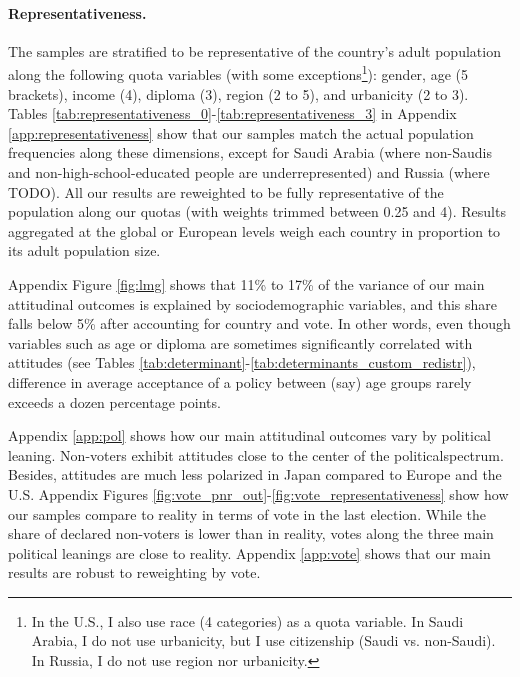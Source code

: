 \documentclass[12pt,english]{article}
\begin{document}
\begin{bibunit}
\paragraph{Representativeness.}
The samples are stratified to be representative of the country's adult population along the following quota variables (with some exceptions\footnote{In the U.S., I also use race (4 categories) as a quota variable. In Saudi Arabia, I do not use urbanicity, but I use citizenship (Saudi vs. non-Saudi). In Russia, I do not use region nor urbanicity.}): gender, age (5 brackets), income (4), diploma (3), region (2 to 5), and urbanicity (2 to 3). Tables \ref{tab:representativeness_0}-\ref{tab:representativeness_3} in Appendix \ref{app:representativeness} show that our samples match the actual population frequencies along these dimensions, except for Saudi Arabia (where non-Saudis and non-high-school-educated people are underrepresented) and Russia (where TODO). All our results are reweighted to be fully representative of the population along our quotas (with weights trimmed between 0.25 and 4). Results aggregated at the global or European levels weigh each country in proportion to its adult population size. 

Appendix Figure \ref{fig:lmg} shows that 11\% to 17\% of the variance of our main attitudinal outcomes is explained by sociodemographic variables, and this share falls below 5\% after accounting for country and vote. In other words, even though variables such as age or diploma are sometimes significantly correlated with attitudes (see Tables \ref{tab:determinant}-\ref{tab:determinants_custom_redistr}), difference in average acceptance of a policy between (say) age groups rarely exceeds a dozen percentage points. %

Appendix \ref{app:pol} shows how our main attitudinal outcomes vary by political leaning. Non-voters exhibit attitudes close to the center of the politicalspectrum. Besides, attitudes are much less polarized in Japan compared to Europe and the U.S. %
Appendix Figures \ref{fig:vote_pnr_out}-\ref{fig:vote_representativeness} show how our %
samples compare to reality in terms of vote in the last election. While the share of declared non-voters is lower than in reality, votes along the three main political leanings are close to reality. Appendix \ref{app:vote} shows that our main results are robust to reweighting by vote. 


\end{bibunit}
\end{document}
